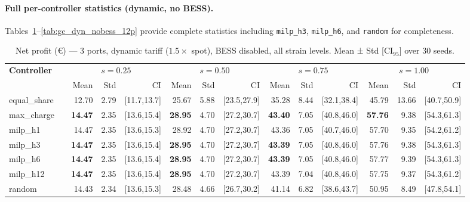 \paragraph{Full per-controller statistics (dynamic, no BESS).}
Tables~\ref{tab:gc_dyn_nobess_3p}--\ref{tab:gc_dyn_nobess_12p} provide
complete statistics including \texttt{milp\_h3}, \texttt{milp\_h6}, and
\texttt{random} for completeness.

\begin{table}[!htb]
\centering
\caption{Net profit (€) — 3 ports, dynamic tariff ($1.5\times$ spot),
         BESS disabled, all strain levels.
         Mean ± Std [CI$_{95}$] over 30 seeds.}
\label{tab:gc_dyn_nobess_3p}
\setlength{\tabcolsep}{3pt}
\begin{tabular}{lp{0.6cm} rrr rrr rrr rrr}
\toprule
\textbf{Controller} & &
  \multicolumn{3}{c}{$s=0.25$} &
  \multicolumn{3}{c}{$s=0.50$} &
  \multicolumn{3}{c}{$s=0.75$} &
  \multicolumn{3}{c}{$s=1.00$} \\
\cmidrule(lr){3-5}\cmidrule(lr){6-8}\cmidrule(lr){9-11}\cmidrule(lr){12-14}
 & & Mean & Std & CI & Mean & Std & CI & Mean & Std & CI & Mean & Std & CI \\
\midrule
equal\_share & & 12.70 & 2.79 & [11.7,13.7] & 25.67 & 5.88 & [23.5,27.9] & 35.28 & 8.44 & [32.1,38.4] & 45.79 & 13.66 & [40.7,50.9] \\
max\_charge  & & \textbf{14.47} & 2.35 & [13.6,15.4] & \textbf{28.95} & 4.70 & [27.2,30.7] & \textbf{43.40} & 7.05 & [40.8,46.0] & \textbf{57.76} &  9.38 & [54.3,61.3] \\
milp\_h1     & & 14.47 & 2.35 & [13.6,15.3] & 28.92 & 4.70 & [27.2,30.7] & 43.36 & 7.05 & [40.7,46.0] & 57.70 &  9.35 & [54.2,61.2] \\
milp\_h3     & & \textbf{14.47} & 2.35 & [13.6,15.4] & \textbf{28.95} & 4.70 & [27.2,30.7] & \textbf{43.39} & 7.05 & [40.8,46.0] & 57.76 &  9.38 & [54.3,61.3] \\
milp\_h6     & & \textbf{14.47} & 2.35 & [13.6,15.4] & \textbf{28.95} & 4.70 & [27.2,30.7] & \textbf{43.39} & 7.05 & [40.8,46.0] & 57.77 &  9.39 & [54.3,61.3] \\
milp\_h12    & & \textbf{14.47} & 2.35 & [13.6,15.4] & \textbf{28.95} & 4.70 & [27.2,30.7] & 43.39 & 7.04 & [40.8,46.0] & 57.75 &  9.37 & [54.3,61.2] \\
random       & & 14.43 & 2.34 & [13.6,15.3] & 28.48 & 4.66 & [26.7,30.2] & 41.14 & 6.82 & [38.6,43.7] & 50.95 &  8.49 & [47.8,54.1] \\
\bottomrule
\end{tabular}
\end{table}

